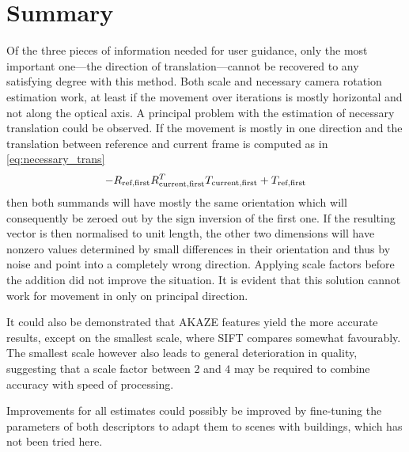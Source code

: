 \section{Summary}

Of the three pieces of information needed for user guidance, only the most
important one---the direction of translation---cannot be recovered to any
satisfying degree with this method. Both scale and necessary camera
rotation estimation work, at least if the movement over iterations is mostly
horizontal and not along the optical axis. A principal problem with the
estimation of necessary translation could be observed. If the movement is mostly
in one direction and the translation between reference and current frame is
computed as in \eqref{eq:necessary_trans}
\begin{equation*}
   -R_{\text{ref,first}}R^T_{\text{current,first}}T_{\text{current,first}} + T_{\text{ref,first}}
\end{equation*}
then both summands will have mostly the same orientation which will consequently
be zeroed out by the sign inversion of the first one. If the resulting vector is
then normalised to unit length, the other two dimensions will have nonzero
values determined by small differences in their orientation and thus by noise
and point into a completely wrong direction. Applying scale factors before the
addition did not improve the situation. It is evident that this solution cannot
work for movement in only on principal direction.

It could also be demonstrated that AKAZE features yield the more accurate
results, except on the smallest scale, where SIFT compares somewhat favourably.
The smallest scale however also leads to general deterioration in quality,
suggesting that a scale factor between $2$ and $4$ may be required to combine accuracy
with speed of processing.

Improvements for all estimates could possibly be improved by fine-tuning the
parameters of both descriptors to adapt them to scenes with buildings, which has
not been tried here.
